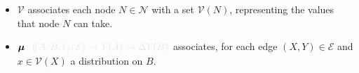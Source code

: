 \documentclass{article}
\newcommand{\notation}[2][]{#1}
\renewcommand{\notation}[2][]{{\color{notationcolor} #2}}
\newcommand{\bmu}{\boldsymbol{\mu}}
\newcommand{\V}{\mathcal V}
\newcommand{\N}{\mathcal N}
\newcommand{\Ed}{\mathcal E}
\newcommand{\MN}{PDG}
\numberwithin{equation}{section}
\begin{document}
\begin{defn}[\MN]
\begin{itemize}[nosep]
\item $\V$ associates each node $N \in
                          \N$ with a set $\V(N)$,
                          representing the values that node $N$ can
                          take. 
			\item $\bmu\notation{\colon \big(\!({A,B,\ell})\colon \! \Ed \big) \to \V(A) \to \Delta\V(B)}$
			  associates, for each edge $(X,Y) \in
                          \Ed$ and $x \in \V(X)$ a distribution on $B$. 

\end{itemize}
\end{defn}
\end{document}

